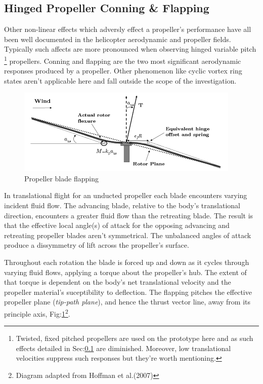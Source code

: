 \subsection{Hinged Propeller Conning \& Flapping}
\label{subsec:dynamics.aero.flap}
Other non-linear effects which adversly effect a propeller's performance have all been well documented in the helicopter aerodynamic and propeller fields\cite{basichelicopter,bramwell}. Typically such affects are more pronounced when observing hinged variable pitch \footnote{Twisted, fixed pitched propellers are used on the prototype here and as such effects detailed in Sec:\ref{subsec:dynamics.aero.flap} are diminished. Moreover, low translational velocities suppress such responses but they're worth mentioning.} propellers. Conning and flapping are the two most significant aerodynamic responses produced by a propeller. Other phenomenon like cyclic vortex ring states aren't applicable here and fall outside the scope of the investigation. 
\par
\begin{figure}[htbp]
\centering
\includegraphics[width=0.95\textwidth]{figs/prop-flap}
\caption{Propeller blade flapping}
\label{fig:prop-flap}
\end{figure}
In translational flight for an unducted propeller each blade encounters varying incident fluid flow. The advancing blade, relative to the body's translational direction, encounters a greater fluid flow than the retreating blade. The result is that the effective local angle(s) of attack for the opposing advancing and retreating propeller blades aren't symmetrical. The unbalanced angles of attack produce a dissymmetry of lift across the propeller's surface.
\par
Throughout each rotation the blade is forced up and down as it cycles through varying fluid flows, applying a torque about the propeller's hub. The extent of that torque is dependent on the body's net translational velocity and the propeller material's suceptibility to deflection. The flapping pitches the effective propeller plane (\emph{tip-path plane}), and hence the thrust vector line, away from its principle axis, Fig:\ref{fig:prop-flap}\footnote{Diagram adapted from Hoffman et al.(2007)\cite{starmac}}.
